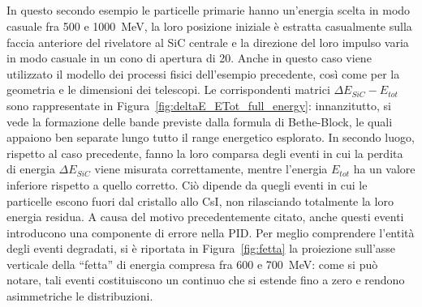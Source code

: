 \subsection{} \label{par:particelle_non_monocromatiche}







In questo secondo esempio le particelle primarie hanno un'energia scelta in modo casuale fra 500 e 1000~MeV, la loro posizione iniziale è estratta casualmente sulla faccia anteriore del rivelatore al SiC centrale e la direzione del loro impulso varia in modo casuale in un cono di apertura di 20\textdegree{}.
Anche in questo caso viene utilizzato il modello dei processi fisici dell'esempio precedente, così come per la geometria e le dimensioni dei telescopi.
Le corrispondenti matrici $\Delta E_{SiC} - E_{tot}$ sono rappresentate in Figura~\ref{fig:deltaE_ETot_full_energy}: innanzitutto, si vede la formazione delle bande previste dalla formula di Bethe-Block, le quali appaiono ben separate lungo tutto il range energetico esplorato.
In secondo luogo, rispetto al caso precedente, fanno la loro comparsa degli eventi in cui la perdita di energia $\Delta E_{SiC}$ viene misurata correttamente, mentre l'energia $E_{tot}$ ha un valore inferiore rispetto a quello corretto. 
Ciò dipende da quegli eventi in cui le particelle escono fuori dal cristallo allo CsI, non rilasciando totalmente la loro energia residua.
A causa del motivo precedentemente citato, anche questi eventi introducono una componente di errore nella PID.
Per meglio comprendere l'entità degli eventi degradati, si è riportata in Figura~\ref{fig:fetta} la proiezione sull'asse verticale della ``fetta'' di energia compresa fra 600 e 700~MeV: come si può notare, tali eventi costituiscono un continuo che si estende fino a zero e rendono asimmetriche le distribuzioni. 
